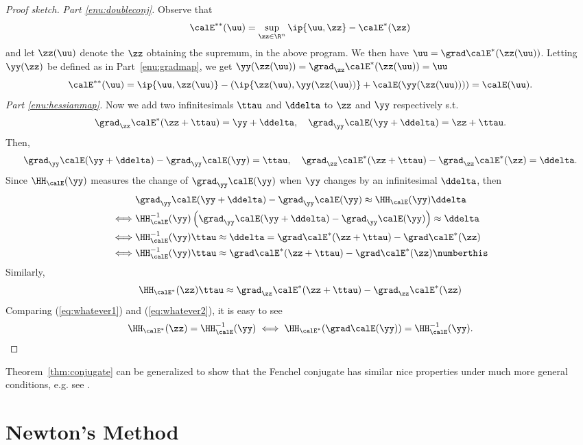 \begin{proof}[Proof sketch]
\emph{Part \ref{enu:doubleconj}.}
  Observe that
  \[ \calE^{**}(\uu) = \sup_{\zz \in \R^n} \ip{\uu,\zz} - \calE^*(\zz) \]
  and let $\zz(\uu)$ denote the $\zz$ obtaining the supremum, in the
  above program.
  We then have ${\uu =\grad\calE^*(\zz(\uu))}$. Letting $\yy(\zz)$ be
  defined as in Part~\ref{enu:gradmap},
  we get $\yy(\zz(\uu)) = \grad_{\zz}\calE^*(\zz(\uu)) = \uu$
  \[
    \calE^{**}(\uu) = \ip{\uu,\zz(\uu)} - \left(
      \ip{\zz(\uu),\yy(\zz(\uu))}+\calE(\yy(\zz(\uu))) \right)
    = \calE(\uu)
  .
  \]
  \emph{Part \ref{enu:hessianmap}.}
  Now we add two infinitesimals $\ttau$ and $\ddelta$ to $\zz$ and $\yy$ respectively s.t.
  \[ \grad_{\zz}\calE^*(\zz+\ttau)=\yy+\ddelta, \quad \grad_{\yy}\calE(\yy+\ddelta) = \zz+\ttau. \]
  Then,
  \[ \grad_{\yy}\calE(\yy+\ddelta) - \grad_{\yy}\calE(\yy) = \ttau, \quad
  \grad_{\zz}\calE^*(\zz+\ttau) - \grad_{\zz}\calE^*(\zz) = \ddelta. \]
  Since $\HH_{\calE}(\yy)$ measures the change of $\grad_{\yy}\calE(\yy)$ when $\yy$ changes by an infinitesimal $\ddelta$, then
  \begin{align*}
    & \grad_{\yy}\calE(\yy+\ddelta) - \grad_{\yy}\calE(\yy) \approx \HH_{\calE}(\yy)\ddelta \\
    \iff & \HH_{\calE}^{-1}(\yy)\left( \grad_{\yy}\calE(\yy+\ddelta) - \grad_{\yy}\calE(\yy) \right) \approx \ddelta \\
    \iff & \HH_{\calE}^{-1}(\yy)\ttau \approx \ddelta = \grad\calE^*(\zz+\ttau) - \grad\calE^*(\zz) \\
    \iff & \HH_{\calE}^{-1}(\yy)\ttau \approx \grad\calE^*(\zz+\ttau) - \grad\calE^*(\zz) \numberthis \label{eq:whatever1}
  \end{align*}
  Similarly,
  \begin{equation}\label{eq:whatever2}
    \HH_{\calE^*}(\zz)\ttau \approx
    \grad_{\zz}\calE^*(\zz+\ttau) - \grad_{\zz}\calE^*(\zz)
  \end{equation}
  Comparing (\ref{eq:whatever1}) and (\ref{eq:whatever2}), it is easy to see
  \[ \HH_{\calE^*}(\zz) = \HH_{\calE}^{-1}(\yy) \iff \HH_{\calE^*}(\grad\calE(\yy)) = \HH_{\calE}^{-1}(\yy). \]
\end{proof}

\begin{remark}
  Theorem~\ref{thm:conjugate} can be generalized to show that the
  Fenchel conjugate has similar nice properties under much more
  general conditions,
  e.g. see \cite{BV04}.
\end{remark}

\section{Newton's Method}
